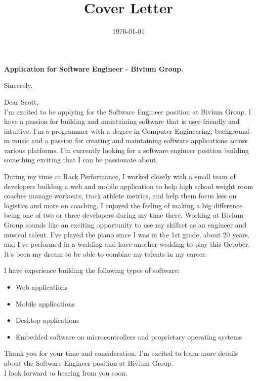 \documentclass[11pt,a4paper,roman]{moderncv}
\title{\companyName{} Cover Letter}
\newcommand{\companyName}{Bivium Group}
\newcommand{\positionName}{Software Engineer}
\begin{document}
\recipient{To}{\companyName \\
Boston, MA }
\date{\today}
\opening{\textbf{Application for \positionName{} - \companyName.}}
\closing{Sincerely, \vspace{-1em}}



\makelettertitle



Dear Scott,
\\
\vspace{1em}
I'm excited to be applying for the Software Engineer position at \companyName. I have a passion for building and maintaining software that is user-friendly and intuitive.
I'm a programmer with a degree in Computer Engineering, background in music and a passion for creating and maintaining software applications across various platforms.
I'm currently looking for a software engineer position building something exciting that I can be passionate about.

\vspace{1em}
During my time at Rack Performance, I worked closely with a small team of developers building a web and mobile application to help high school weight room coaches 
manage workouts, track athlete metrics, and help them focus less on logistics and more on coaching. I enjoyed the feeling of making a big difference 
being one of two or three developers during my time there.
Working at \companyName{} sounds like an exciting opportunity to use my skillset as an engineer and musical
talent. I've played the piano since I was in the 1st grade, about 20 years, and I've performed in a wedding and
have another wedding to play this October. It's been my dream to be able to combine my talents in my career.
\vspace{1em}

I have experience building the following types of software:
\vspace{0.5em}
\begin{itemize}
\item Web applications
\item Mobile applications
\item Desktop applications
\item Embedded software on microcontrollers and proprietary operating systems
\end{itemize}

\vspace{1em}
Thank you for your time and consideration. I'm excited to learn more details about the \positionName{} 
position at \companyName. \\

\vspace{1em}
I look forward to hearing from you soon.

\vspace{0.5cm}


\makeletterclosing
\end{document}
